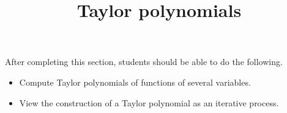 \documentclass{ximera}
\title{Taylor polynomials}
\begin{document}
\begin{abstract}
\end{abstract}

\maketitle

\begin{sectionOutcomes}

After completing this section, students should be able to do the following.

\begin{itemize}
\item Compute Taylor polynomials of functions of several variables. 
\item View the construction of a Taylor polynomial as an iterative process. 
\end{itemize}

\end{sectionOutcomes}
\end{document}

